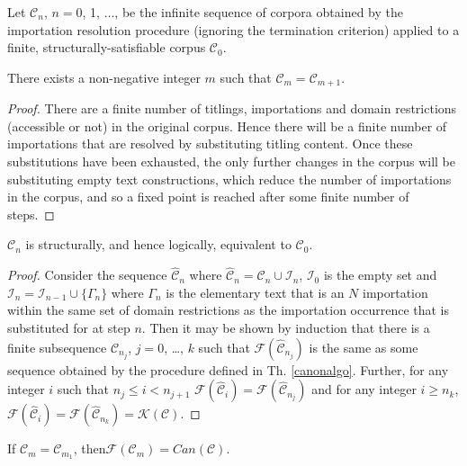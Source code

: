 \documentclass{IOS-Book-Article}
\newcommand{\corp}{ \mathcal{C} }
\newcommand{\corphat}{ \hat{\mathcal{C}} }
\newcommand{\Formal}{\mathcal{F}}
\newcommand{\Core}{\mathcal{K}}
\newcommand{\Canon}{\mathit{Can}}
\begin{document}
Let $\corp_n$, $n=$0, 1, $\ldots$, be the infinite sequence of corpora obtained by the importation resolution procedure (ignoring the termination criterion) applied to a finite, structurally-satisfiable corpus $\corp_0$.
\begin{theo}
\label{termination}
There exists a non-negative integer $m$ such that $\corp_{m}=\corp_{m+1}$. 
\begin{proof}
There are a finite number of titlings, importations and domain restrictions (accessible or not) in the original corpus.
Hence there will be a finite number of importations that are resolved by substituting titling content.
Once these substitutions have been exhausted, the only further changes in the corpus will be substituting empty text constructions, which reduce the number of importations in the corpus, and so a fixed point is reached after some finite number of steps.
\end{proof}
\end{theo}

\begin{theo}
\label{resolve}
$\corp_n$ is structurally, and hence logically, equivalent to $\corp_0$.
\begin{proof} Consider the sequence $\corphat_n$ where $\corphat_n = \corp_n \cup \mathcal{I}_n$, $\mathcal{I}_0$ is the empty set and $\mathcal{I}_n = \mathcal{I}_{n-1} \cup \{\Gamma_n\}$ where $\Gamma_n$ is the elementary text that is an $N$ importation within the same set of domain restrictions as the importation occurrence that is substituted for at step $n$.
Then it may be shown by induction that there is a finite subsequence $\corp_{n_j}$,  $j=$0, \ldots, $k$ such that $\Formal(\corphat_{n_j})$ is the same as some sequence obtained by the procedure defined in Th. \ref{canonalgo}. Further, for any integer $i$ such that $n_j \le i < n_{j+1}$ $\Formal(\corphat_i) = \Formal(\corphat_{n_j})$ and for any integer $i \ge n_k$, $\Formal(\corphat_i) = \Formal(\corphat_{n_k}) = \Core(\corp)$.
\end{proof}
\end{theo}


\begin{cor}
If $\corp_m = \corp_{m_1}$, then$\Formal(\corp_m) = \Canon(\corp)$.
\end{cor}









\end{document}

